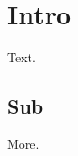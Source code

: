 \documentclass{letter}
\begin{document}
\section{Intro}
Text.
\subsection{Sub}
More.
\end{document}
